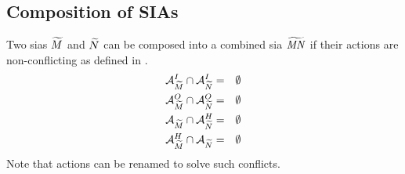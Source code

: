 \subsection{Composition of SIAs}
\label{sect_sia_composition}
Two \glspl{sia} $\widetilde{M}$ and $\widetilde{N}$ can be composed into a combined \gls{sia} $\widetilde{\mathit{MN}}$ if their actions are non-conflicting as defined in \Equ{\ref{eq_sia_def}}.
\begin{eqnarray}
    \label{eq_sia_def}
    \mathcal{A}_{\widetilde{M}}^I \cap \mathcal{A}_{\widetilde{N}}^I &=& \emptyset \nonumber \\
    \mathcal{A}_{\widetilde{M}}^O \cap \mathcal{A}_{\widetilde{N}}^O &=& \emptyset \nonumber \\
    \mathcal{A}_{\widetilde{M}} \cap  \mathcal{A}_{\widetilde{N}}^H &=& \emptyset \nonumber \\
    \mathcal{A}_{\widetilde{M}}^H \cap \mathcal{A}_{\widetilde{N}} &=& \emptyset
\end{eqnarray}
Note that actions can be renamed to solve such conflicts.


